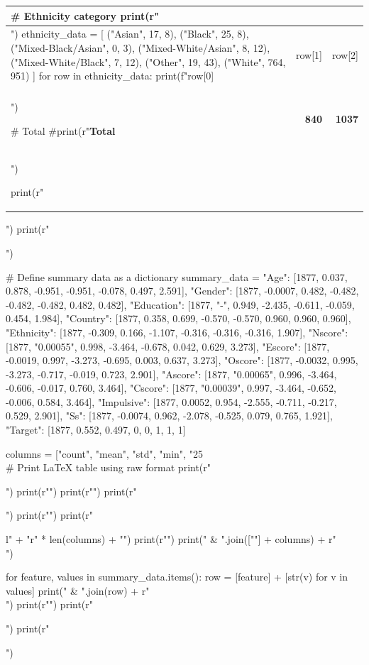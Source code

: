 \documentclass{article}
\begin{document}
\begin{pycode}
\begin{center}
\begin{tabular}{|l|r|r|}
# Ethnicity category
print(r"\multicolumn{3}{|l|}{\textbf{Ethnicity category}} \\ \hline")
ethnicity_data = [
    ("Asian", 17, 8),
    ("Black", 25, 8),
    ("Mixed-Black/Asian", 0, 3),
    ("Mixed-White/Asian", 8, 12),
    ("Mixed-White/Black", 7, 12),
    ("Other", 19, 43),
    ("White", 764, 951)
]
for row in ethnicity_data:
    print(f"{row[0]} & {row[1]} & {row[2]} \\\\ \hline")

# Total
#print(r"\textbf{Total} & \textbf{840} & \textbf{1037} \\ \hline")

print(r"\end{tabular}")
print(r"\end{center}")
\end{pycode}


\begin{pycode}
# Define summary data as a dictionary
summary_data = {
    "Age":         [1877, 0.037, 0.878, -0.951, -0.951, -0.078, 0.497, 2.591],
    "Gender":      [1877, -0.0007, 0.482, -0.482, -0.482, -0.482, 0.482, 0.482],
    "Education":   [1877, "-", 0.949, -2.435, -0.611, -0.059, 0.454, 1.984],
    "Country":     [1877, 0.358, 0.699, -0.570, -0.570, 0.960, 0.960, 0.960],
    "Ethnicity":   [1877, -0.309, 0.166, -1.107, -0.316, -0.316, -0.316, 1.907],
    "Nscore":      [1877, "0.00055", 0.998, -3.464, -0.678, 0.042, 0.629, 3.273],
    "Escore":      [1877, -0.0019, 0.997, -3.273, -0.695, 0.003, 0.637, 3.273],
    "Oscore":      [1877, -0.0032, 0.995, -3.273, -0.717, -0.019, 0.723, 2.901],
    "Ascore":      [1877, "0.00065", 0.996, -3.464, -0.606, -0.017, 0.760, 3.464],
    "Cscore":      [1877, "0.00039", 0.997, -3.464, -0.652, -0.006, 0.584, 3.464],
    "Impulsive":   [1877, 0.0052, 0.954, -2.555, -0.711, -0.217, 0.529, 2.901],
    "Ss":          [1877, -0.0074, 0.962, -2.078, -0.525, 0.079, 0.765, 1.921],
    "Target":      [1877, 0.552, 0.497, 0, 0, 1, 1, 1]
}

columns = ["count", "mean", "std", "min", "25\\%

# Print LaTeX table using raw format
print(r"\begin{table}[h!]")
print(r"\centering")
print(r"\small")
print(r"\caption{Summary statistics of features and target variable}")
print(r"\label{tab:summary_statistics}")
print(r"\begin{tabular}{l" + "r" * len(columns) + "}")
print(r"\toprule")
print(" & ".join([""] + columns) + r" \\ \midrule")

for feature, values in summary_data.items():
    row = [feature] + [str(v) for v in values]
    print(" & ".join(row) + r" \\")
print(r"\bottomrule")
print(r"\end{tabular}")
print(r"\end{table}")
\end{pycode}
\end{document}
